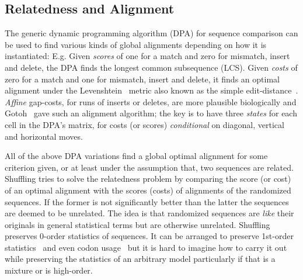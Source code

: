 \documentclass[letterpaper,11pt,oneside]{article}
\begin{document}
\begin{multicols}{2}
\subsection{Relatedness and Alignment} \label{sec:rel}

The generic dynamic programming algorithm (DPA) for
sequence comparison can be used to find various kinds
of global alignments depending on how it is instantiated: E.g.
Given {\em scores} of one for a match and zero for mismatch, insert and delete,
the DPA finds the longest common subsequence (LCS).
Given {\em costs} of zero for a match and one for mismatch, insert and delete,
it finds an optimal alignment under the Levenshtein~\cite{levenshtein66}
metric also known as the simple
edit-distance~\cite{sellers74}.
{\em Affine} gap-costs, for runs of inserts or deletes,
are more plausible biologically and Gotoh~\cite{gotoh82}
gave such an alignment algorithm; the key is to have three {\em states}
for each cell in the DPA's matrix, for costs (or scores)
{\em conditional} on diagonal, vertical and horizontal moves.

All of the above DPA variations find a global optimal alignment for
some criterion given, or at least under the assumption that,
two sequences are related.
Shuffling tries to solve the relatedness problem by comparing the
score (or cost) of an optimal alignment with the scores (costs)
of alignments of the randomized sequences.
If the former is not significantly better than the latter
the sequences are deemed to be unrelated.
The idea is that randomized sequences are {\em like} their originals in
general statistical terms but are otherwise unrelated.
Shuffling preserves 0-order statistics of sequences.
It can be arranged to preserve 1st-order statistics~\cite{fitch83}
and even codon usage~\cite{altschul85} but it is hard to imagine how
to carry it out while preserving the statistics of an arbitrary model
particularly if that is a mixture or is high-order.


\end{multicols}
\end{document}
